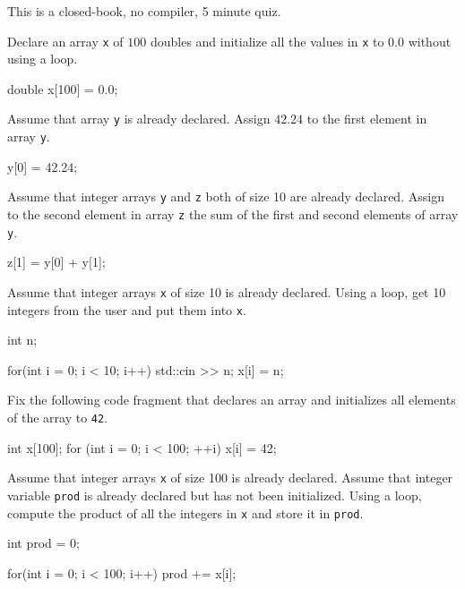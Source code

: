 

This is a closed-book, no compiler, 5 minute quiz.

\nextq
Declare an array \verb!x! of $100$ doubles and initialize all the values in
\verb!x! to $0.0$ without using a loop.
\\
\ANSWER
\begin{answercode}
double x[100] = {0.0};
\end{answercode}

\nextq
Assume that array \verb!y! is already declared.
Assign $42.24$ to the first element in array \verb!y!.
\\
\ANSWER
\begin{answercode}
y[0] = 42.24;
\end{answercode}

\nextq
Assume that integer
arrays \verb!y! and \verb!z! both of size 10 are already declared.
Assign to the second element in array \verb!z! the sum of the first and second
elements of array \verb!y!.
\\
\ANSWER
\begin{answercode}
z[1] = y[0] + y[1];
\end{answercode}

\nextq
Assume that integer
arrays \verb!x! of size 10 is already declared.
Using a loop, get 10 integers from the user and put them into \verb!x!.
\\
\ANSWER
\begin{answercode}
int n;

for(int i = 0; i < 10; i++)
{
     std::cin >> n;
     x[i] = n;
}
\end{answercode}

\nextq
Fix the following code fragment that declares an array and initializes all
elements of the array to \verb!42!.
\\
\ANSWER
\begin{answercode}
int x[100];
for (int i = 0; i < 100; ++i)
{
    x[i] = 42;
}
\end{answercode}

\nextq
Assume that integer
arrays \verb!x! of size 100 is already declared.
Assume that integer variable \verb!prod! is already declared but has not been
initialized.
Using a loop, compute the product of all the integers in \verb!x!
and store it in \verb!prod!.
\\
\ANSWER
\begin{answercode}
int prod = 0;

for(int i = 0; i < 100; i++)
{
     prod += x[i];
}
\end{answercode}



